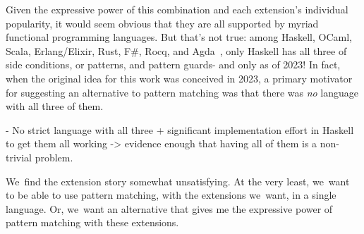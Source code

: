 \documentclass[manuscript,screen 12pt, nonacm]{acmart}
\begin{document}
    Given the expressive power of this combination and each extension's
    individual popularity, it would seem obvious that they are all supported by
    myriad functional programming languages. But that's not true: among Haskell,
    OCaml, Scala, Erlang/Elixir, Rust, F\#, Rocq, and Agda~\citep{haskell,
    ocaml, scala, erlang, elixir, rust, fsharp, agda}, only Haskell has all
    three of side conditions, or patterns, and pattern guards- and only as of
    2023! In fact, when the original idea for this work was conceived in 2023, a
    primary motivator for suggesting an alternative to pattern matching was that
    there was \textit{no} language with all three of them. 

    - No strict language with all three + significant implementation effort in
    Haskell to get them all working -> evidence enough that having all of them
    is a non-trivial problem. 
    
    We~find the extension story somewhat unsatisfying. At the very least,
    we~want to be able to use pattern matching, with the extensions we~want, in
    a single language. Or, we~want an alternative that gives me the expressive
    power of pattern matching with these extensions. 
\end{document}
